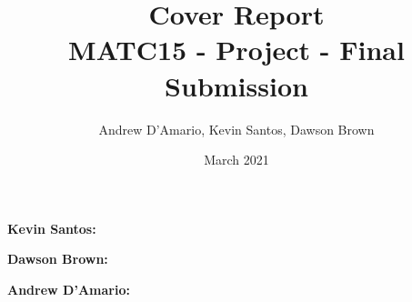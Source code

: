 \documentclass{article}
\title{Cover Report \\ \vspace{.3in} \large{MATC15 - Project - Final Submission}}
\author{Andrew D'Amario, Kevin Santos, Dawson Brown}
\date{March 2021}
\begin{document}
\maketitle

{\bf Kevin Santos: }

\vspace{.2in}

{\bf Dawson Brown: }

\vspace{.2in}

{\bf Andrew D'Amario: }
\end{document}
